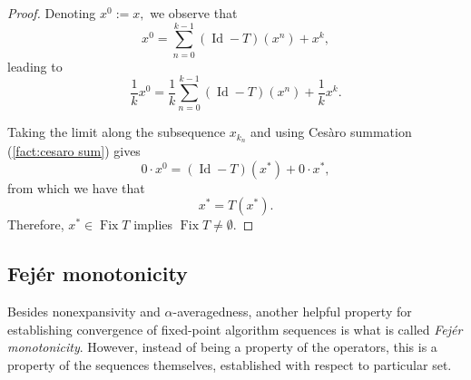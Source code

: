 \documentclass[smallextended,numbook,nospthms]{svjour3}
\theoremstyle{plain}
\theoremstyle{definition}
\DeclareMathOperator{\Id}{Id}
\DeclareMathOperator{\Fix}{Fix}
\begin{document}
\begin{proof}
Denoting $x^{0}:=x,$ we observe that
\[
x^{0}=\sum_{n=0}^{k-1}(\Id-T)\left(x^{n}\right)+x^{k},
\]
leading to
\[
\frac{1}{k} x^{0}=\frac{1}{k} \sum_{n=0}^{k-1}(\Id-T)\left(x^{n}\right)+\frac{1}{k} x^{k}.
\]

Taking the limit along the subsequence $x_{k_{n}}$ and using Cesàro summation (\cref{fact:cesaro sum}) gives
\[
0 \cdot x^{0}=(\Id-T)\left(x^{*}\right) + 0 \cdot x^{*},
\]
from which we have that
\[
x^{*}=T\left(x^{*}\right).
\]
Therefore, $x^{*} \in \Fix T$ implies $\Fix T \neq \emptyset$.
\end{proof}

\subsection{Fejér monotonicity}
Besides nonexpansivity and $\alpha$-averagedness, another helpful property for establishing convergence of fixed-point algorithm sequences is what is called \emph{Fejér monotonicity}. However, instead of being a property of the operators, this is a property of the sequences themselves, established with respect to  particular set.
\end{document}
